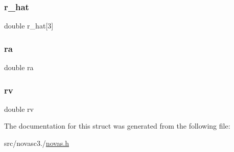 \mbox{\label{structsky__pos_a5fd669be4d5224aa192afa368a6e3173}} 
\subsubsection{\texorpdfstring{r\+\_\+hat}{r\_hat}}
{\footnotesize\ttfamily double r\+\_\+hat\mbox{[}3\mbox{]}}

\mbox{\label{structsky__pos_a713a0c71a86d92fa6892fdb2cb7c9422}} 
\subsubsection{\texorpdfstring{ra}{ra}}
{\footnotesize\ttfamily double ra}

\mbox{\label{structsky__pos_ad9e8b5daff39072d109a6f4f1fa61f55}} 
\subsubsection{\texorpdfstring{rv}{rv}}
{\footnotesize\ttfamily double rv}



The documentation for this struct was generated from the following file\+:\begin{DoxyCompactItemize}
\item 
src/novasc3./\mbox{\hyperlink{novas_8h}{novas.\+h}}\end{DoxyCompactItemize}
